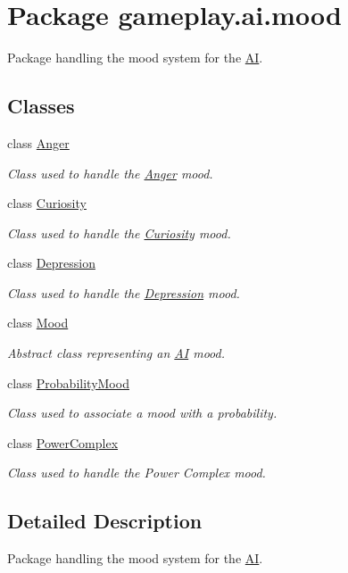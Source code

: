 \hypertarget{namespacegameplay_1_1ai_1_1mood}{\section{Package gameplay.\-ai.\-mood}
\label{namespacegameplay_1_1ai_1_1mood}
}


Package handling the mood system for the \hyperlink{classgameplay_1_1ai_1_1_a_i}{A\-I}.  


\subsection*{Classes}
\begin{DoxyCompactItemize}
\item 
class \hyperlink{classgameplay_1_1ai_1_1mood_1_1_anger}{Anger}
\begin{DoxyCompactList}\small\item\em Class used to handle the \hyperlink{classgameplay_1_1ai_1_1mood_1_1_anger}{Anger} mood. \end{DoxyCompactList}\item 
class \hyperlink{classgameplay_1_1ai_1_1mood_1_1_curiosity}{Curiosity}
\begin{DoxyCompactList}\small\item\em Class used to handle the \hyperlink{classgameplay_1_1ai_1_1mood_1_1_curiosity}{Curiosity} mood. \end{DoxyCompactList}\item 
class \hyperlink{classgameplay_1_1ai_1_1mood_1_1_depression}{Depression}
\begin{DoxyCompactList}\small\item\em Class used to handle the \hyperlink{classgameplay_1_1ai_1_1mood_1_1_depression}{Depression} mood. \end{DoxyCompactList}\item 
class \hyperlink{classgameplay_1_1ai_1_1mood_1_1_mood}{Mood}
\begin{DoxyCompactList}\small\item\em Abstract class representing an \hyperlink{classgameplay_1_1ai_1_1_a_i}{A\-I} mood. \end{DoxyCompactList}\item 
class \hyperlink{classgameplay_1_1ai_1_1mood_1_1_probability_mood}{Probability\-Mood}
\begin{DoxyCompactList}\small\item\em Class used to associate a mood with a probability. \end{DoxyCompactList}\item 
class \hyperlink{classgameplay_1_1ai_1_1mood_1_1_power_complex}{Power\-Complex}
\begin{DoxyCompactList}\small\item\em Class used to handle the Power Complex mood. \end{DoxyCompactList}\end{DoxyCompactItemize}


\subsection{Detailed Description}
Package handling the mood system for the \hyperlink{classgameplay_1_1ai_1_1_a_i}{A\-I}. 